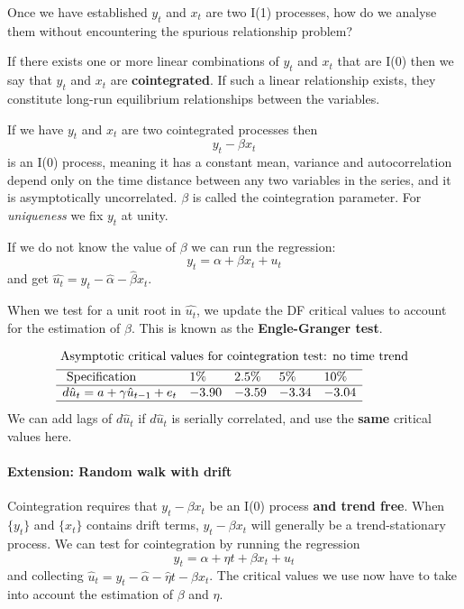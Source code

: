 \documentclass[11pt]{article}
\begin{document}
Once we have established $y_t$ and $x_t$ are two I(1) processes, how do we analyse them without encountering the spurious relationship problem?

If there exists one or more linear combinations of $y_t$ and $x_t$ that are I(0) then we say that $y_t$ and $x_t$ are \textbf{cointegrated}. If such a linear relationship exists, they constitute long-run equilibrium relationships between the variables.

If we have $y_t$ and $x_t$ are two cointegrated processes then 
\[y_t - \beta x_t\]
is an I(0) process, meaning it has a constant mean, variance and autocorrelation depend only on the time distance between any two variables in the series, and it is asymptotically uncorrelated. $\beta$ is called the cointegration parameter. For \textit{uniqueness} we fix $y_t$ at unity.

If we do not know the value of $\beta$ we can run the regression:
\[y_t = \alpha + \beta x_t + u_t\]
and get $\hat{u_t}= y_t - \hat{\alpha} -\hat{\beta}x_t$.

When we test for a unit root in $\hat{u_t}$, we update the DF critical values to account for the estimation of $\beta$. This is known as the \textbf{Engle-Granger test}.

\begin{equation}
\begin{aligned}
&\text { Asymptotic critical values for cointegration test: no time trend }\\
&\begin{array}{lllll}
\hline \text { Specification } & 1 \% & 2.5 \% & 5 \% & 10 \% \\
\hline d \hat{u}_t=a+\gamma \hat{u}_{t-1}+e_t & -3.90 & -3.59 & -3.34 & -3.04 \\
\hline
\end{array}
\end{aligned}
\end{equation}
We can add lags of $d\hat{u}_t$ if $d\hat{u}_t$ is serially correlated, and use the \textbf{same} critical values here.

\paragraph{Extension: Random walk with drift} \mbox{}

Cointegration requires that $y_t - \beta x_t$ be an I(0) process \textbf{and trend free}. When $\{y_t\}$ and $\{x_t\}$ contains drift terms, $y_t - \beta x_t$ will generally be a trend-stationary process. We can test for cointegration by running the regression
\[y_t = \alpha + \eta t + \beta x_t + u_t\]
and collecting $\hat{u}_t = y_t - \hat{\alpha} - \hat{\eta} t - \hat{\beta} x_t $. The critical values we use now have to take into account the estimation of $\beta$ and $\eta$.
\end{document}
